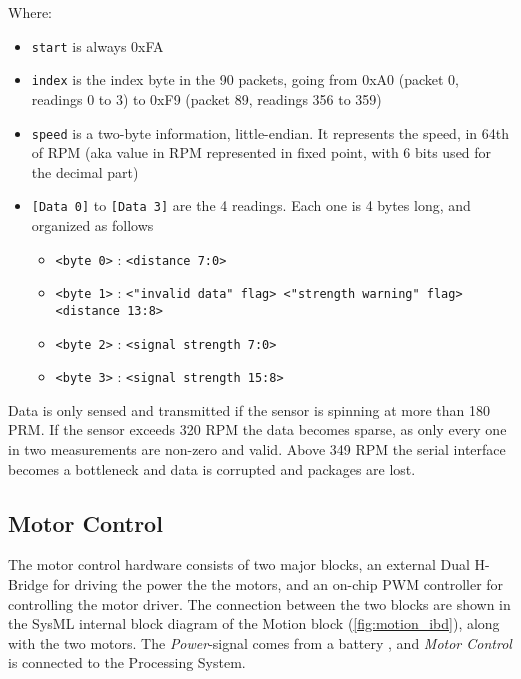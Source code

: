 \documentclass[Main]{subfiles}
\begin{document}
			Where:
			\vspace{-12pt}
			\begin{itemize}
				\item \texttt{start} is always 0xFA

				\item \texttt{index} is the index byte in the 90 packets, going from 0xA0 (packet 0, readings 0 to 3) to 0xF9 (packet 89, readings 356 to 359)

				\item \texttt{speed} is a two-byte information, little-endian. It represents the speed, in 64th of RPM (aka value in RPM represented in fixed point, with 6 bits used for the decimal part)

				\item \texttt{[Data 0]} to \texttt{[Data 3]} are the 4 readings. Each one is 4 bytes long, and organized as follows 
				\begin{itemize}
					\item \texttt{<byte 0>} : \texttt{<distance 7:0>}

					\item \texttt{<byte 1>} : \texttt{<"invalid data" flag> <"strength warning" flag> <distance 13:8>}

					\item \texttt{<byte 2>} : \texttt{<signal strength 7:0>}

					\item \texttt{<byte 3>} : \texttt{<signal strength 15:8>}
				\end{itemize}
			\end{itemize}

			Data is only sensed and transmitted if the sensor is spinning at more than 180 PRM.
			If the sensor exceeds 320 RPM the data becomes sparse, as only every one in two measurements are non-zero and valid.
			Above 349 RPM the serial interface becomes a bottleneck and data is corrupted and packages are lost.

	

	\subsection{Motor Control} %
	\label{sub:motor_control}

		The motor control hardware consists of two major blocks, an external Dual H-Bridge for driving the power the the motors, and an on-chip PWM controller for controlling the motor driver.
		The connection between the two blocks are shown in the SysML internal block diagram of the Motion block (\autoref{fig:motion_ibd}), along with the two motors.
		The \emph{Power}-signal comes from a battery , and \emph{Motor Control} is connected to the Processing System.
\end{document}
